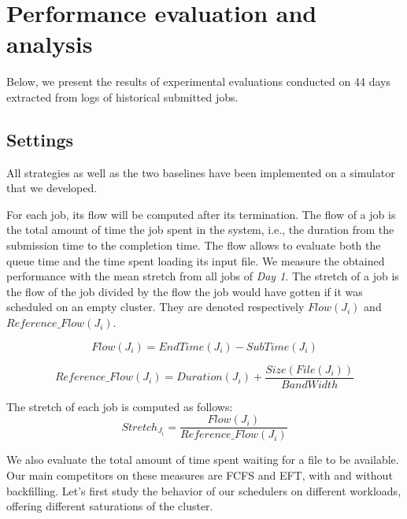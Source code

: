 \documentclass[conference,10pt]{IEEEtran}
\newcommand{\file}{\ensuremath{\mathit{File}}\xspace}
\newcommand{\size}{\ensuremath{\mathit{Size}}\xspace}
\newcommand{\duration}{\mathit{Duration}\xspace}
\newcommand{\bandwidth}{\mathit{BandWidth}\xspace}
\newcommand{\submissiontime}{\mathit{SubTime}\xspace}
\newcommand{\emptyflow}{\mathit{Reference\_Flow}\xspace}
\newcommand{\Endtime}{\mathit{EndTime}\xspace}
\begin{document}
\section{Performance evaluation and analysis}\label{sec.evaluations}

Below, we present the results of experimental evaluations conducted 
on 44 days extracted from logs of historical submitted jobs.

\subsection{Settings}

All strategies as well as the two baselines have been implemented on
a simulator that we developed.

For each job, its flow will be computed after its termination.
The flow of a job is the total amount of time the job spent in the system, i.e.,
the duration from the submission time to the completion time. The flow
allows to evaluate both the queue time and the time spent loading its input file.
We measure the obtained performance with the mean
stretch from all jobs of \textit{Day 1}.
The stretch of a job is the flow of the job divided
by the flow the job would have gotten if it was scheduled on an empty cluster.
They are denoted respectively $Flow(J_i)$ and $\emptyflow(J_i)$.

\begin{equation}
Flow(J_i) = \Endtime(J_i) - \submissiontime(J_i)
\end{equation}

\begin{equation}
\emptyflow(J_i) = \duration(J_i) + \frac{\size(\file(J_i))}{\bandwidth}
\end{equation}

The stretch of each job is computed as follows:
\begin{equation}
Stretch_{J_i} = \frac{Flow(J_i)}{\emptyflow(J_i)}
\end{equation}

We also evaluate the total amount of time spent waiting for a file to be available.
Our main competitors on these measures are FCFS and EFT, with and without backfilling.
Let's first study the behavior of our schedulers on different workloads,
offering different saturations of the cluster.
\end{document}

